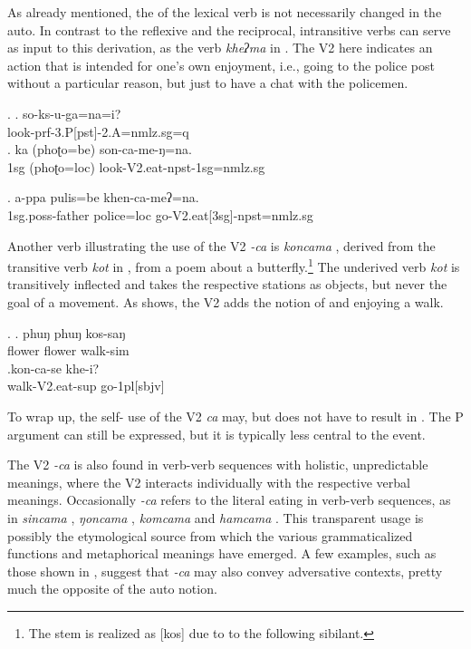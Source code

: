 As already mentioned, the  of the lexical verb is not necessarily changed in the auto. In contrast to the reflexive and the reciprocal,  intransitive verbs can serve as input to this derivation, as the verb \emph{kheʔma}  in \NNext. The V2 here indicates an action that is intended for one's own enjoyment, i.e., going to the police post without a particular reason, but just to have a chat with the policemen.

\ex. \ag.  so-ks-u-ga=na=i?\\
look{\sc -prf-3.P[pst]-2.A=nmlz.sg=q}\\
	\bg. ka (phoʈo=be) son-ca-me-ŋ=na.\\
	{\sc 1sg} (phoʈo{\sc =loc}) look{\sc -V2.eat-npst-1sg=nmlz.sg}\\


\exg. a-ppa pulis=be khen-ca-meʔ=na.\\
	{\sc 1sg.poss}-father police{\sc =loc} go{\sc -V2.eat[3sg]-npst=nmlz.sg}\\


Another verb illustrating the use of the V2 \emph{-ca} is \emph{koncama} , derived from the transitive verb \emph{kot}  in \Next[a], from a poem about a butterfly.\footnote{The stem is realized as [kos] due to  to the following sibilant.}  The underived verb \emph{kot} is transitively inflected and takes the respective stations as objects, but never the goal of a movement. As  \Next[b] shows, the V2 adds the notion of  and enjoying a walk.
\largerpage

	\ex. \ag. phuŋ  phuŋ  kos-saŋ\\
	flower flower walk{\sc -sim} \\
	 
\bg.kon-ca-se khe-i?\\
	walk-{\sc V2.eat-sup} go-{\sc 1pl[sbjv]}\\


To wrap up, the self- use of the V2 \emph{ca} may, but does not have to result in . The P argument can still be expressed, but it is typically less central to the event. 

The V2 \emph{-ca} is also found in verb-verb sequences with holistic, unpredictable meanings, where the V2 interacts individually with the respective verbal meanings. Occasionally \emph{-ca} refers to the literal eating in verb-verb sequences, as in \emph{sincama} , \emph{ŋoncama} , \emph{komcama}  and \emph{hamcama} . This transparent usage is possibly the etymological source from which the various grammaticalized functions and metaphorical meanings have  emerged. A few  examples, such as those shown in \Next, suggest that \emph{-ca} may also convey adversative contexts, pretty much the opposite of the auto notion. 

